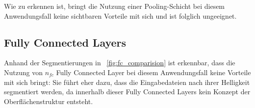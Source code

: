
Wie zu erkennen ist, bringt die Nutzung einer Pooling-Schicht bei diesem Anwendungsfall keine sichtbaren Vorteile mit sich und ist folglich ungeeignet.

\subsection{Fully Connected Layers}
\label{ssec:exp_fully_connected}

Anhand der Segmentierungen in \figurename~\ref{fig:fc_comparision} ist erkennbar, dass die Nutzung von $n_{fc}$ Fully Connected Layer bei diesem Anwendungsfall keine Vorteile mit sich bringt: Sie führt eher dazu, dass die Eingabedateien nach ihrer Helligkeit segmentiert werden, da innerhalb dieser Fully Connected Layers kein Konzept der Oberflächenstruktur entsteht.

